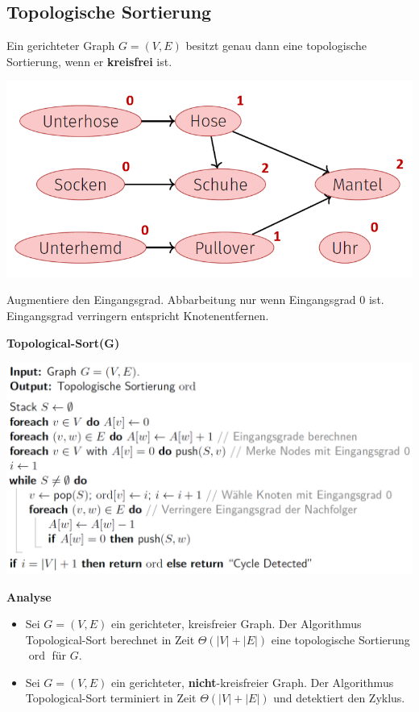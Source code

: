\begin{sectionbox}
\subsection{Topologische Sortierung}\smallskip
\begin{greenbox}
Ein gerichteter Graph $G=(V, E)$ besitzt genau dann eine topologische Sortierung, wenn er \textbf{kreisfrei} ist.
\end{greenbox}\smallskip

\begin{center}
    \includegraphics[width = 0.9\columnwidth]{../img/topoSort.png}
\end{center}\par\smallskip
Augmentiere den Eingangsgrad. Abbarbeitung nur wenn Eingangsgrad $0$ ist. Eingangsgrad verringern entspricht Knotenentfernen.\par\smallskip

\textbf{Topological-Sort(G)}\par
\includegraphics[width = \columnwidth]{../img/topoSortG.png}\par\smallskip

\textbf{Analyse}\par
\begin{itemize}
    \item Sei $G=(V, E)$ ein gerichteter, kreisfreier Graph. Der Algorithmus Topological-Sort berechnet in Zeit $\Theta(|V|+|E|)$ eine topologische Sortierung $\operatorname{ord}$ für $G$.
    \item Sei $G=(V, E)$ ein gerichteter, \textbf{nicht}-kreisfreier Graph. Der Algorithmus Topological-Sort terminiert in Zeit $\Theta(|V|+|E|)$ und detektiert den Zyklus.
\end{itemize}

\end{sectionbox}
